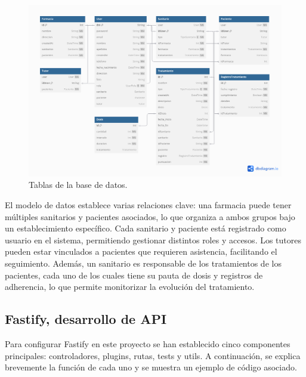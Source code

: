 \begin{figure}[h!]
	\centering
	\includegraphics[width=1\textwidth]{imagenes/tablasbd.png}
	\caption{Tablas de la base de datos.}
\end{figure}

El modelo de datos establece varias relaciones clave: una farmacia puede tener múltiples sanitarios y pacientes asociados, lo que organiza a ambos grupos bajo un establecimiento específico. Cada sanitario y paciente está registrado como usuario en el sistema, permitiendo gestionar distintos roles y accesos. Los tutores pueden estar vinculados a pacientes que requieren asistencia, facilitando el seguimiento. Además, un sanitario es responsable de los tratamientos de los pacientes, cada uno de los cuales tiene su pauta de dosis y registros de adherencia, lo que permite monitorizar la evolución del tratamiento.

\subsection{Fastify, desarrollo de API}

Para configurar Fastify en este proyecto se han establecido cinco componentes principales: controladores, plugins, rutas, tests y utils. A continuación, se explica brevemente la función de cada uno y se muestra un ejemplo de código asociado.

